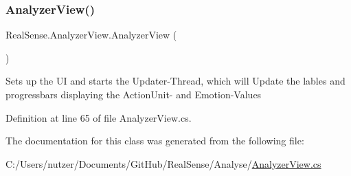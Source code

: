 \subsubsection{\texorpdfstring{Analyzer\+View()}{AnalyzerView()}}
{\footnotesize\ttfamily Real\+Sense.\+Analyzer\+View.\+Analyzer\+View (\begin{DoxyParamCaption}{ }\end{DoxyParamCaption})}

Sets up the UI and starts the Updater-\/\+Thread, which will Update the lables and progressbars displaying the Action\+Unit-\/ and Emotion-\/\+Values 

Definition at line 65 of file Analyzer\+View.\+cs.



The documentation for this class was generated from the following file\+:\begin{DoxyCompactItemize}
\item 
C\+:/\+Users/nutzer/\+Documents/\+Git\+Hub/\+Real\+Sense/\+Analyse/\hyperlink{_analyzer_view_8cs}{Analyzer\+View.\+cs}\end{DoxyCompactItemize}
